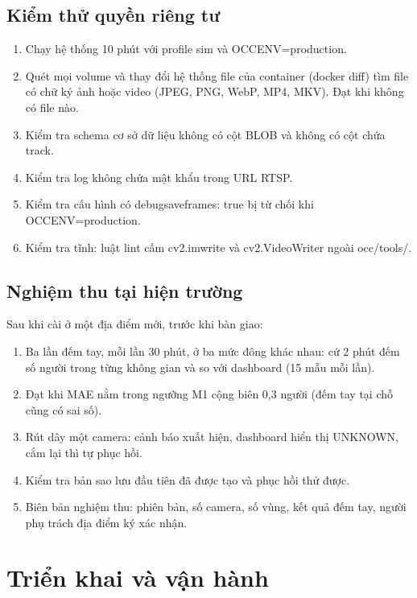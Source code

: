 \documentclass[10pt,a4paper,oneside,openany]{report}
\newcommand{\breakus}{\textunderscore\allowbreak}
\newcommand{\file}[1]{{\ttfamily\let\_\breakus #1}}
\newcommand{\code}[1]{{\ttfamily\let\_\breakus #1}}
\begin{document}
\section{Kiểm thử quyền riêng tư}\label{sec:ktriengtu}
\begin{enumerate}
  \item Chạy hệ thống 10 phút với profile \code{sim} và \code{OCC\_ENV=production}.
  \item Quét mọi volume và thay đổi hệ thống file của container (\code{docker diff}) tìm file có chữ ký ảnh hoặc video (JPEG, PNG, WebP, MP4, MKV).
        Đạt khi không có file nào.
  \item Kiểm tra schema cơ sở dữ liệu không có cột BLOB và không có cột chứa \code{track}.
  \item Kiểm tra log không chứa mật khẩu trong URL RTSP.
  \item Kiểm tra cấu hình có \code{debug\_save\_frames: true} bị từ chối khi \code{OCC\_ENV=production}.
  \item Kiểm tra tĩnh: luật lint cấm \code{cv2.imwrite} và \code{cv2.VideoWriter} ngoài \file{occ/tools/}.
\end{enumerate}

\section{Nghiệm thu tại hiện trường}\label{sec:nghiemthu}
Sau khi cài ở một địa điểm mới, trước khi bàn giao:
\begin{enumerate}
  \item Ba lần đếm tay, mỗi lần 30 phút, ở ba mức đông khác nhau: cứ 2 phút đếm số người trong từng không gian và so với dashboard (15 mẫu mỗi lần).
  \item Đạt khi MAE nằm trong ngưỡng M1 cộng biên 0,3 người (đếm tay tại chỗ cũng có sai số).
  \item Rút dây một camera: cảnh báo xuất hiện, dashboard hiển thị \code{UNKNOWN}, cắm lại thì tự phục hồi.
  \item Kiểm tra bản sao lưu đầu tiên đã được tạo và phục hồi thử được.
  \item Biên bản nghiệm thu: phiên bản, số camera, số vùng, kết quả đếm tay, người phụ trách địa điểm ký xác nhận.
\end{enumerate}
\chapter{Triển khai và vận hành}\label{ch:trienkhai}
\end{document}
